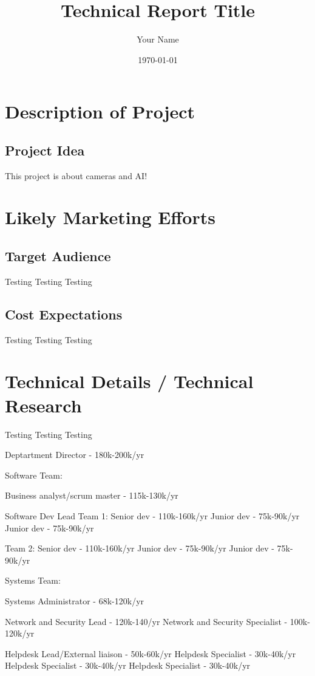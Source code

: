\documentclass{report}
\title{Technical Report Title}
\author{Your Name}
\date{\today}
\begin{document}
\maketitle

\tableofcontents
\newpage

\chapter{Description of Project}
\section{Project Idea}
This project is about cameras and AI!

\chapter{Likely Marketing Efforts}
\section{Target Audience}
Testing Testing Testing
\section{Cost Expectations}
Testing Testing Testing

\chapter{Technical Details / Technical Research}
Testing Testing Testing

Deptartment Director - 180k-200k/yr

Software Team:

    Business analyst/scrum master - 115k-130k/yr

    Software Dev Lead
        Team 1:
    Senior dev - 110k-160k/yr
        Junior dev - 75k-90k/yr
        Junior dev - 75k-90k/yr
        
        Team 2:
        Senior dev - 110k-160k/yr
        Junior dev - 75k-90k/yr
        Junior dev - 75k-90k/yr


Systems Team:

    Systems Administrator - 68k-120k/yr

    Network and Security Lead - 120k-140/yr
        Network and Security Specialist - 100k-120k/yr
        
    Helpdesk Lead/External liaison - 50k-60k/yr
        Helpdesk Specialist - 30k-40k/yr
        Helpdesk Specialist - 30k-40k/yr
        Helpdesk Specialist - 30k-40k/yr
\end{document}
